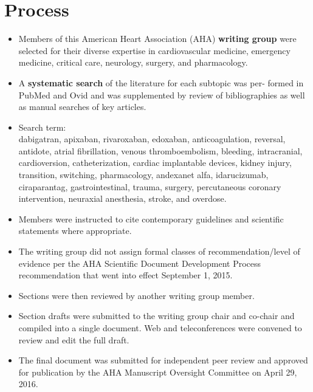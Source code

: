 \documentclass{article}
\begin{document}
\section{Process}
\begin{itemize}
	\item Members of this American Heart Association (AHA) \textbf{writing group} were selected for their diverse expertise in cardiovascular medicine, emergency medicine, critical care, neurology, surgery, and pharmacology.
	\item A \textbf{systematic search} of the literature for each subtopic was per- formed in PubMed and Ovid and was supplemented by review of bibliographies as well as manual searches of key articles.
	\item  Search term:\\
	dabigatran, apixaban, rivaroxaban, edoxaban, anticoagulation, reversal, antidote, atrial fibrillation, venous thromboembolism, bleeding, intracranial, cardioversion, catheterization, cardiac implantable devices, kidney injury, transition, switching, pharmacology, andexanet alfa, idarucizumab, ciraparantag, gastrointestinal, trauma, surgery, percutaneous coronary intervention, neuraxial anesthesia, stroke, and overdose.
	\item Members were instructed to cite contemporary guidelines and scientific statements where appropriate.
	\item The writing group did not assign formal classes of recommendation/level of evidence per the AHA Scientific Document Development Process recommendation that went into effect September 1, 2015. 
	\item Sections were then reviewed by another writing group member. 
	\item Section drafts were submitted to the writing group chair and co-chair and compiled into a single document. Web and teleconferences were convened to review and edit the full draft.
	\item The final document was submitted for independent peer review and approved for publication by the AHA Manuscript Oversight Committee on April 29, 2016.
\end{itemize}
\end{document}
